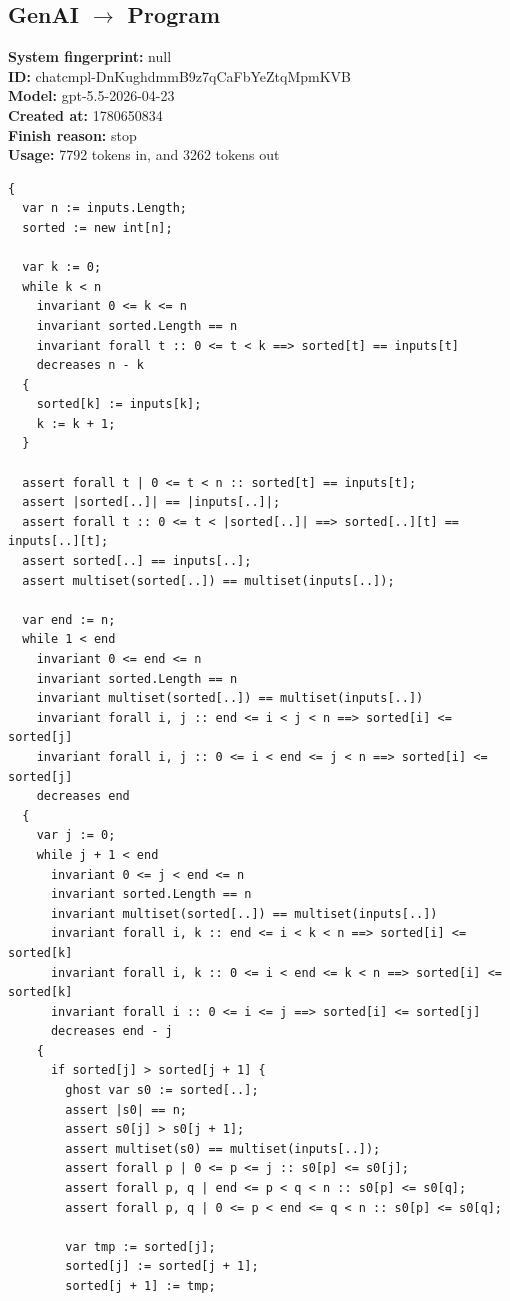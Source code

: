 \documentclass{article}
\begin{document}
\subsection*{GenAI $\rightarrow$ Program}
\textbf{System fingerprint: }null
\\\textbf{ID: }chatcmpl-DnKughdmmB9z7qCaFbYeZtqMpmKVB
\\\textbf{Model: }gpt-5.5-2026-04-23
\\\textbf{Created at: }1780650834
\\\textbf{Finish reason: }stop
\\\textbf{Usage: }7792 tokens in, and 3262 tokens out
\begin{lstlisting}
{
  var n := inputs.Length;
  sorted := new int[n];

  var k := 0;
  while k < n
    invariant 0 <= k <= n
    invariant sorted.Length == n
    invariant forall t :: 0 <= t < k ==> sorted[t] == inputs[t]
    decreases n - k
  {
    sorted[k] := inputs[k];
    k := k + 1;
  }

  assert forall t | 0 <= t < n :: sorted[t] == inputs[t];
  assert |sorted[..]| == |inputs[..]|;
  assert forall t :: 0 <= t < |sorted[..]| ==> sorted[..][t] == inputs[..][t];
  assert sorted[..] == inputs[..];
  assert multiset(sorted[..]) == multiset(inputs[..]);

  var end := n;
  while 1 < end
    invariant 0 <= end <= n
    invariant sorted.Length == n
    invariant multiset(sorted[..]) == multiset(inputs[..])
    invariant forall i, j :: end <= i < j < n ==> sorted[i] <= sorted[j]
    invariant forall i, j :: 0 <= i < end <= j < n ==> sorted[i] <= sorted[j]
    decreases end
  {
    var j := 0;
    while j + 1 < end
      invariant 0 <= j < end <= n
      invariant sorted.Length == n
      invariant multiset(sorted[..]) == multiset(inputs[..])
      invariant forall i, k :: end <= i < k < n ==> sorted[i] <= sorted[k]
      invariant forall i, k :: 0 <= i < end <= k < n ==> sorted[i] <= sorted[k]
      invariant forall i :: 0 <= i <= j ==> sorted[i] <= sorted[j]
      decreases end - j
    {
      if sorted[j] > sorted[j + 1] {
        ghost var s0 := sorted[..];
        assert |s0| == n;
        assert s0[j] > s0[j + 1];
        assert multiset(s0) == multiset(inputs[..]);
        assert forall p | 0 <= p <= j :: s0[p] <= s0[j];
        assert forall p, q | end <= p < q < n :: s0[p] <= s0[q];
        assert forall p, q | 0 <= p < end <= q < n :: s0[p] <= s0[q];

        var tmp := sorted[j];
        sorted[j] := sorted[j + 1];
        sorted[j + 1] := tmp;


\end{lstlisting}
\end{document}
